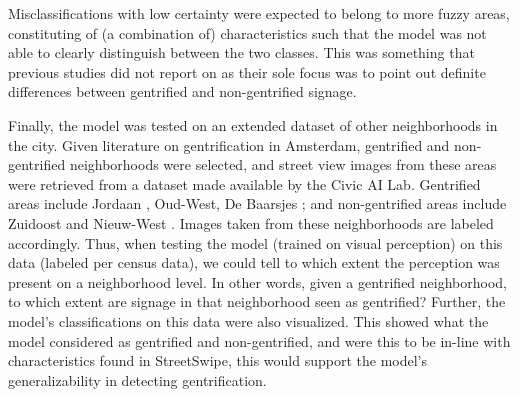 Misclassifications with low certainty were expected to belong to more fuzzy areas, constituting of (a combination of) characteristics such that the model was not able to clearly distinguish between the two classes. This was something that previous studies did not report on as their sole focus was to point out definite differences between gentrified and non-gentrified signage.

Finally, the model was tested on an extended dataset of other neighborhoods in the city. Given literature on gentrification in Amsterdam, gentrified and non-gentrified neighborhoods were selected, and street view images from these areas were retrieved from a dataset made available by the Civic AI Lab. Gentrified areas include Jordaan \cite{verlaan_hippies_2022}, Oud-West, De Baarsjes \cite{rettberg_when_2019}; and non-gentrified areas include Zuidoost and Nieuw-West \cite{pinkster_stickiness_2020}. Images taken from these neighborhoods are labeled accordingly. Thus, when testing the model (trained on visual perception) on this data (labeled per census data), we could tell to which extent the perception was present on a neighborhood level. In other words, given a gentrified neighborhood, to which extent are signage in that neighborhood seen as gentrified? Further, the model's classifications on this data were also visualized. This showed what the model considered as gentrified and non-gentrified, and were this to be in-line with characteristics found in StreetSwipe, this would support the model's generalizability in detecting gentrification.

